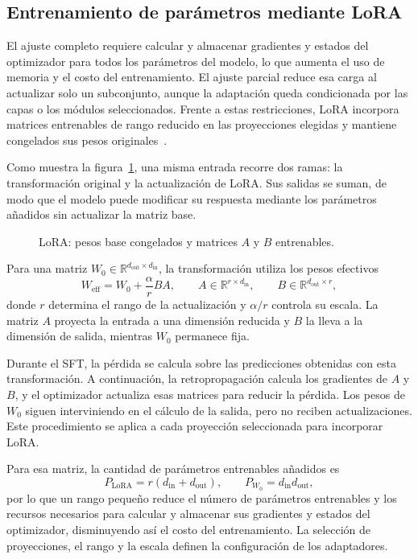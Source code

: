 \subsection{Entrenamiento de parámetros mediante LoRA}
\label{sec:sft-parametros}
El ajuste completo requiere calcular y almacenar gradientes y estados del optimizador para todos los parámetros del modelo, lo que aumenta el uso de memoria y el costo del entrenamiento. El ajuste parcial reduce esa carga al actualizar solo un subconjunto, aunque la adaptación queda condicionada por las capas o los módulos seleccionados. Frente a estas restricciones, LoRA incorpora matrices entrenables de rango reducido en las proyecciones elegidas y mantiene congelados sus pesos originales~\cite{hu2022lora}.

Como muestra la figura~\ref{fig:sft-parametros}, una misma entrada recorre dos ramas: la transformación original y la actualización de LoRA. Sus salidas se suman, de modo que el modelo puede modificar su respuesta mediante los parámetros añadidos sin actualizar la matriz base.

\begin{figure}[htbp]
\centering

\caption{LoRA: pesos base congelados y matrices $A$ y $B$ entrenables.}
\label{fig:sft-parametros}
\end{figure}

Para una matriz $W_0\in\mathbb{R}^{d_{\mathrm{out}}\times d_{\mathrm{in}}}$, la transformación utiliza los pesos efectivos
\begin{equation}
W_{\mathrm{eff}}=W_0+\frac{\alpha}{r}BA,
\qquad A\in\mathbb{R}^{r\times d_{\mathrm{in}}},
\qquad B\in\mathbb{R}^{d_{\mathrm{out}}\times r},
\label{eq:sft-lora}
\end{equation}
donde $r$ determina el rango de la actualización y $\alpha/r$ controla su escala. La matriz $A$ proyecta la entrada a una dimensión reducida y $B$ la lleva a la dimensión de salida, mientras $W_0$ permanece fija.

Durante el SFT, la pérdida se calcula sobre las predicciones obtenidas con esta transformación. A continuación, la retropropagación calcula los gradientes de $A$ y $B$, y el optimizador actualiza esas matrices para reducir la pérdida. Los pesos de $W_0$ siguen interviniendo en el cálculo de la salida, pero no reciben actualizaciones. Este procedimiento se aplica a cada proyección seleccionada para incorporar LoRA.

Para esa matriz, la cantidad de parámetros entrenables añadidos es
\begin{equation}
P_{\mathrm{LoRA}}=r(d_{\mathrm{in}}+d_{\mathrm{out}}),
\qquad P_{W_0}=d_{\mathrm{in}}d_{\mathrm{out}},
\label{eq:sft-lora-parametros}
\end{equation}
por lo que un rango pequeño reduce el número de parámetros entrenables y los recursos necesarios para calcular y almacenar sus gradientes y estados del optimizador, disminuyendo así el costo del entrenamiento. La selección de proyecciones, el rango y la escala definen la configuración de los adaptadores.
